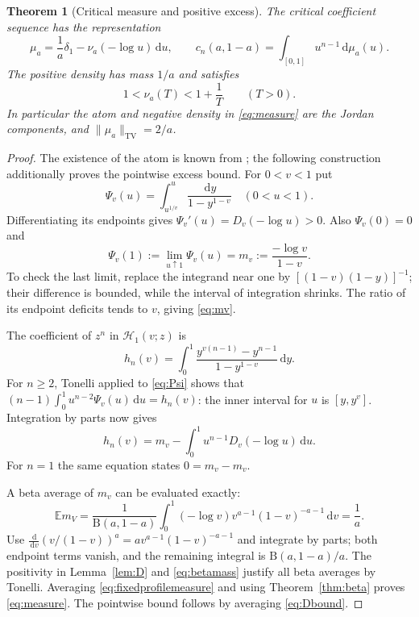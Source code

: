 \documentclass[11pt]{article}
\numberwithin{equation}{section}
\newtheorem{theorem}{Theorem}[section]
\theoremstyle{definition}\newtheorem{definition}[theorem]{Definition}
\theoremstyle{remark}\newtheorem{remark}[theorem]{Remark}
\newcommand{\dd}{\,\mathrm d}
\newcommand{\E}{\mathbb E}
\newcommand{\HH}{\mathcal H}
\newcommand{\BB}{\mathrm B}
\begin{document}
\begin{theorem}[Critical measure and positive excess]\label{thm:measure}
The critical coefficient sequence has the representation
\begin{equation}\label{eq:measure}
 \mu_a=\frac1a\delta_1-\nu_a(-\log u)\dd u,\qquad
 c_n(a,1-a)=\int_{[0,1]}u^{n-1}\dd\mu_a(u).
\end{equation}
The positive density has mass $1/a$ and satisfies
\begin{equation}\label{eq:nubound}
 1<\nu_a(T)<1+\frac1T\qquad(T>0).
\end{equation}
In particular the atom and negative density in \eqref{eq:measure}
are the Jordan components, and $\|\mu_a\|_{\mathrm{TV}}=2/a$.
\end{theorem}
\begin{proof}
The existence of the atom is known from \cite{threshold}; the following
construction additionally proves the pointwise excess bound.
For $0<v<1$ put
\begin{equation}\label{eq:Psi}
 \Psi_v(u)=\int_{u^{1/v}}^u\frac{\dd y}{1-y^{1-v}}\quad(0<u<1).
\end{equation}
Differentiating its endpoints gives
$\Psi_v'(u)=D_v(-\log u)>0$. Also $\Psi_v(0)=0$ and
\begin{equation}\label{eq:mv}
 \Psi_v(1):=\lim_{u\uparrow1}\Psi_v(u)
 =m_v:=\frac{-\log v}{1-v}.
\end{equation}
To check the last limit, replace the integrand near one by
$[(1-v)(1-y)]^{-1}$; their difference is bounded, while the interval
of integration shrinks. The ratio of its endpoint deficits tends to
$v$, giving \eqref{eq:mv}.

The coefficient of $z^n$ in $\HH_1(v;z)$ is
\begin{equation}\label{eq:profilecoeff}
 h_n(v)=\int_0^1
 \frac{y^{v(n-1)}-y^{n-1}}{1-y^{1-v}}\dd y.
\end{equation}
For $n\ge2$, Tonelli applied to \eqref{eq:Psi} shows that
$(n-1)\int_0^1u^{n-2}\Psi_v(u)\dd u=h_n(v)$: the inner interval
for $u$ is $[y,y^v]$. Integration by parts now gives
\begin{equation}\label{eq:fixedprofilemeasure}
 h_n(v)=m_v-\int_0^1u^{n-1}D_v(-\log u)\dd u.
\end{equation}
For $n=1$ the same equation states $0=m_v-m_v$.

A beta average of $m_v$ can be evaluated exactly:
\begin{equation}\label{eq:betamass}
 \E m_V
 =\frac1{\BB(a,1-a)}\int_0^1
 (-\log v)v^{a-1}(1-v)^{-a-1}\dd v=\frac1a.
\end{equation}
Use
$\frac{\dd}{\dd v}(v/(1-v))^a
 =a v^{a-1}(1-v)^{-a-1}$ and integrate by parts; both endpoint
terms vanish, and the remaining integral is $\BB(a,1-a)/a$.
The positivity in Lemma~\ref{lem:D} and \eqref{eq:betamass} justify
all beta averages by Tonelli. Averaging \eqref{eq:fixedprofilemeasure}
and using Theorem~\ref{thm:beta} proves \eqref{eq:measure}.
The pointwise bound follows by averaging \eqref{eq:Dbound}.
\end{proof}
\end{document}
